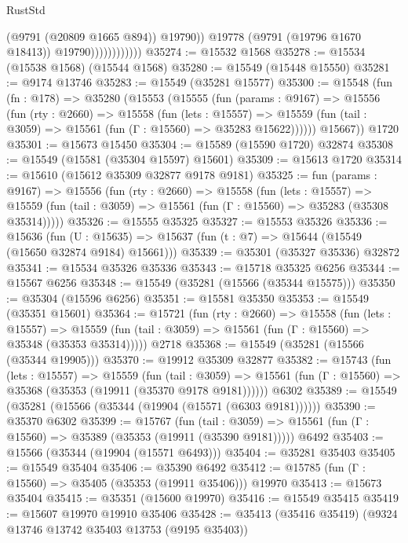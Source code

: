 \begin{lexlean}{RustStd}
\begin{coremodule}
                                (@9791 (@20809 @1665 @894))
                                @19790))
                            @19778
                            (@9791 (@19796 @1670 @18413))
                            @19790))))))))))))
@35274 := @15532 @1568
@35278 := @15534 (@15538 @1568) (@15544 @1568)
@35280 := @15549 (@15448 @15550)
@35281 := @9174 @13746
@35283 := @15549 (@35281 @15577)
@35300 := @15548
    (fun (fn : @178) =>
    @35280
      (@15553
        (@15555
          (fun (params : @9167) =>
          @15556
            (fun (rty : @2660) =>
            @15558
              (fun (lets : @15557) =>
              @15559 (fun (tail : @3059) => @15561 (fun (Γ : @15560) => @35283 @15622))))))
        @15667))
    @1720
@35301 := @15673 @15450
@35304 := @15589 (@15590 @1720) @32874
@35308 := @15549 (@15581 (@35304 @15597) @15601)
@35309 := @15613 @1720
@35314 := @15610 (@15612 @35309 @32877 @9178 @9181)
@35325 := fun (params : @9167) =>
  @15556
    (fun (rty : @2660) =>
    @15558
      (fun (lets : @15557) =>
      @15559 (fun (tail : @3059) => @15561 (fun (Γ : @15560) => @35283 (@35308 @35314)))))
@35326 := @15555 @35325
@35327 := @15553 @35326
@35336 := @15636
    (fun (U : @15635) => @15637 (fun (t : @7) => @15644 (@15549 (@15650 @32874 @9184) @15661)))
@35339 := @35301 (@35327 @35336) @32872
@35341 := @15534 @35326 @35336
@35343 := @15718 @35325 @6256
@35344 := @15567 @6256
@35348 := @15549 (@35281 (@15566 (@35344 @15575)))
@35350 := @35304 (@15596 @6256)
@35351 := @15581 @35350
@35353 := @15549 (@35351 @15601)
@35364 := @15721
    (fun (rty : @2660) =>
    @15558
      (fun (lets : @15557) =>
      @15559 (fun (tail : @3059) => @15561 (fun (Γ : @15560) => @35348 (@35353 @35314)))))
    @2718
@35368 := @15549 (@35281 (@15566 (@35344 @19905)))
@35370 := @19912 @35309 @32877
@35382 := @15743
    (fun (lets : @15557) =>
    @15559
      (fun (tail : @3059) =>
      @15561 (fun (Γ : @15560) => @35368 (@35353 (@19911 (@35370 @9178 @9181))))))
    @6302
@35389 := @15549 (@35281 (@15566 (@35344 (@19904 (@15571 (@6303 @9181))))))
@35390 := @35370 @6302
@35399 := @15767
    (fun (tail : @3059) => @15561 (fun (Γ : @15560) => @35389 (@35353 (@19911 (@35390 @9181)))))
    @6492
@35403 := @15566 (@35344 (@19904 (@15571 @6493)))
@35404 := @35281 @35403
@35405 := @15549 @35404
@35406 := @35390 @6492
@35412 := @15785 (fun (Γ : @15560) => @35405 (@35353 (@19911 @35406))) @19970
@35413 := @15673 @35404
@35415 := @35351 (@15600 @19970)
@35416 := @15549 @35415
@35419 := @15607 @19970 @19910 @35406
@35428 := @35413 (@35416 @35419) (@9324 @13746 @13742 @35403 @13753 (@9195 @35403))

\end{coremodule}
\end{lexlean}
